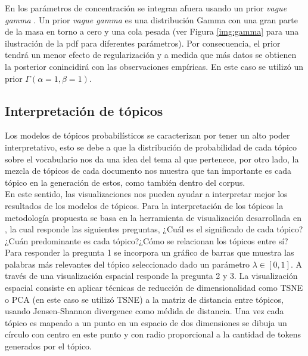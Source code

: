 \documentclass[letterpaper,12pt,oneside]{book} %
\begin{document}
En \citep{teh2005sharing} los parámetros de concentración se integran afuera usando un prior \textit{vague gamma} \citep{escobar1995bayesian}. Un prior \textit{vague gamma} es una distribución Gamma con una gran parte de la masa en torno a cero y una cola pesada (ver Figura \ref{img:gamma} para una ilustración de la pdf para diferentes parámetros). Por consecuencia, el prior tendrá un menor efecto de regularización y a medida que más datos se obtienen la posterior conincidirá con las observaciones empíricas. En este caso se utilizó un prior $\Gamma(\alpha=1, \beta=1)$.

\subsection{Interpretación de tópicos}

Los modelos de tópicos probabilísticos se caracterizan por tener un alto poder interpretativo, esto se debe a que la distribución de probabilidad de cada tópico sobre el vocabulario nos da una idea del tema al que pertenece, por otro lado, la mezcla de tópicos de cada documento nos muestra que tan importante es cada tópico en la generación de estos, como también dentro del corpus. \\

En este sentido, las visualizaciones nos pueden ayudar a interpretar mejor los resultados de los modelos de tópicos. Para la interpretación de los tópicos la metodología propuesta se basa en la herramienta de visualización desarrollada en  \citep{sievert2014ldavis}, la cual responde las siguientes preguntas, ¿Cuál es el significado de cada tópico?¿Cuán predominante es cada tópico?¿Cómo se relacionan los tópicos entre sí?\\

Para responder la pregunta 1 se incorpora un gráfico de barras que muestra las palabras más relevantes del tópico seleccionado dado un parámetro $\lambda \in [0,1]$. A través de una visualización espacial responde la pregunta 2 y 3. La visualización espacial consiste en aplicar técnicas de reducción de dimensionalidad como TSNE \citep{maaten2008visualizing} o PCA \citep{wold1987principal} (en este caso se utilizó TSNE) a la matriz de distancia entre tópicos, usando Jensen-Shannon divergence \citep{endres2003new} como médida de distancia. Una vez cada tópico es mapeado a un punto en un espacio de dos dimensiones se dibuja un círculo con centro en este punto y con radio proporcional a la cantidad de tokens generados por el tópico.\\
\end{document}
